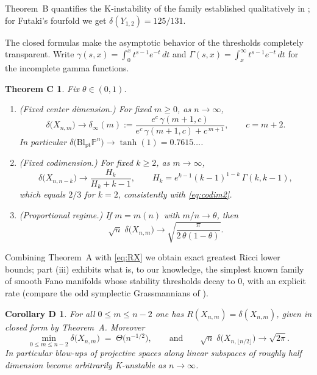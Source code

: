 \documentclass[11pt]{amsart}
\newtheorem*{thmC}{Theorem C}
\newtheorem*{corD}{Corollary D}
\theoremstyle{definition}
\theoremstyle{remark}
\newcommand{\PP}{\mathbb{P}}
\newcommand{\Bl}{\mathrm{Bl}}
\begin{document}
Theorem~B quantifies the K-instability of the family established
qualitatively in \cite{Futaki83,Delcroix22}; for Futaki's fourfold we
get $\delta(Y_{1,2})=125/131$.

The closed formulas make the asymptotic behavior of the thresholds
completely transparent. Write
$\gamma(s,x)=\int_0^x t^{s-1}e^{-t}\,dt$ and
$\Gamma(s,x)=\int_x^\infty t^{s-1}e^{-t}\,dt$ for the incomplete gamma
functions.

\begin{thmC}\label{thm:C}
Fix $\theta\in(0,1)$.
\begin{enumerate}[label=\textup{(\roman*)}]
\item \textup{(Fixed center dimension.)} For fixed $m\ge 0$, as
$n\to\infty$,
\[
\delta\bigl(X_{n,m}\bigr)\longrightarrow
\delta_\infty(m):=\frac{e^{c}\,\gamma(m+1,c)}{e^{c}\,\gamma(m+1,c)+c^{\,m+1}},
\qquad c=m+2 .
\]
In particular
$\delta\bigl(\Bl_{\mathrm{pt}}\PP^n\bigr)\to\tanh(1)=0.7615\ldots$.
\item \textup{(Fixed codimension.)} For fixed $k\ge2$, as
$m\to\infty$,
\[
\delta\bigl(X_{n,n-k}\bigr)\longrightarrow
\frac{H_k}{H_k+k-1},
\qquad H_k=e^{k-1}(k-1)^{1-k}\,\Gamma(k,k-1),
\]
which equals $2/3$ for $k=2$, consistently with \eqref{eq:codim2}.
\item \textup{(Proportional regime.)} If $m=m(n)$ with
$m/n\to\theta$, then
\[
\sqrt{n}\;\delta\bigl(X_{n,m}\bigr)\longrightarrow
\sqrt{\frac{\pi}{2\,\theta(1-\theta)}} .
\]
\end{enumerate}
\end{thmC}

Combining Theorem~A with \eqref{eq:RX} we obtain exact greatest Ricci
lower bounds; part (iii) exhibits what is, to our knowledge, the
simplest known family of smooth Fano manifolds whose stability
thresholds decay to $0$, with an explicit rate (compare the odd
symplectic Grassmannians of \cite{HKP23}).

\begin{corD}\label{cor:D}
For all $0\le m\le n-2$ one has
$R(X_{n,m})=\delta(X_{n,m})$, given in closed form by Theorem~A.
Moreover
\[
\min_{0\le m\le n-2}\delta\bigl(X_{n,m}\bigr)\;=\;
\Theta\bigl(n^{-1/2}\bigr),
\qquad\text{and}\qquad
\sqrt{n}\;\delta\bigl(X_{n,\lfloor n/2\rfloor}\bigr)
\longrightarrow\sqrt{2\pi} .
\]
In particular blow-ups of projective spaces along linear subspaces of
roughly half dimension become arbitrarily K-unstable as $n\to\infty$.
\end{corD}
\end{document}
